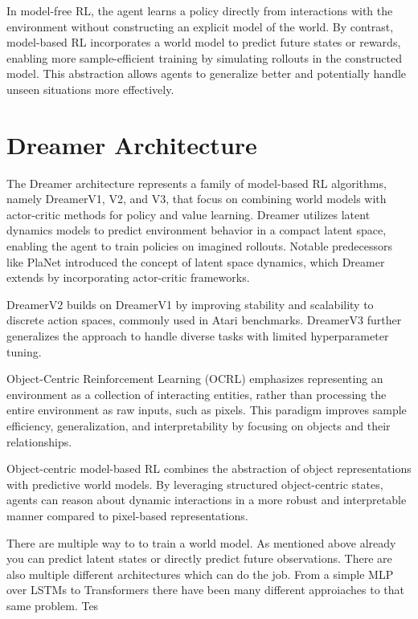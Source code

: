 \documentclass[
	english,
	ruledheaders=section,
	class=report,
	thesis={type=master},
	accentcolor=9c,
	custommargins=true,
	marginpar=false,
	parskip=half-,
	fontsize=11pt,
]{tudapub}
\begin{document}
In model-free RL, the agent learns a policy directly from interactions with the environment without
 constructing an explicit model of the world. By contrast, model-based RL incorporates a world model 
 to predict future states or rewards, enabling more sample-efficient training by simulating rollouts
  in the constructed model. This abstraction allows agents to generalize better and potentially handle unseen
   situations more effectively.

\section{Dreamer Architecture}
\label{sec:dreamer_architecture}

The Dreamer architecture represents a family of model-based RL algorithms, namely DreamerV1, V2, and V3,
 that focus on combining world models with actor-critic methods for policy and value learning. Dreamer
  utilizes latent dynamics models to predict environment behavior in a compact latent space, enabling
   the agent to train policies on imagined rollouts. Notable predecessors like PlaNet introduced the 
   concept of latent space dynamics, which Dreamer extends by incorporating actor-critic frameworks.

DreamerV2 builds on DreamerV1 by improving stability and scalability to discrete action spaces,
 commonly used in Atari benchmarks. DreamerV3 further generalizes the approach to handle diverse 
 tasks with limited hyperparameter tuning.



Object-Centric Reinforcement Learning (OCRL) emphasizes representing an environment as a collection of interacting entities, rather than processing the entire environment as raw inputs, such as pixels. This paradigm improves sample efficiency, generalization, and interpretability by focusing on objects and their relationships.

Object-centric model-based RL combines the abstraction of object representations with predictive world models. By leveraging structured object-centric states, agents can reason about dynamic interactions in a more robust and interpretable manner compared to pixel-based representations.


There are multiple way to to train a world model. As mentioned above already you can predict latent states or directly predict future observations. There are also multiple different architectures which can do the job. From a simple MLP over LSTMs to Transformers there have been many different approiaches to that same problem. Tes
\end{document}
